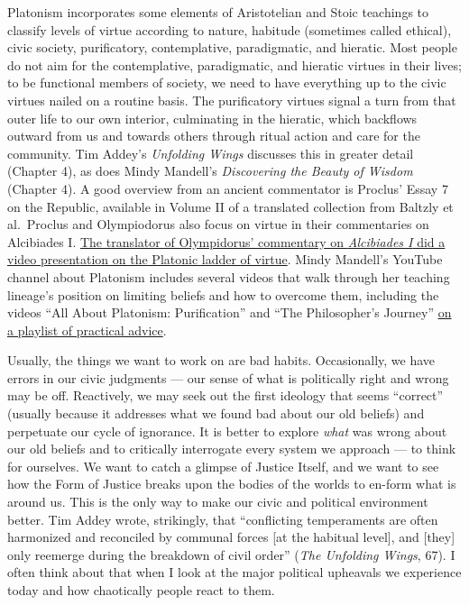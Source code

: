 \documentclass[
]{book}
\begin{document}
Platonism incorporates some elements of Aristotelian and Stoic teachings to classify levels of virtue according to nature, habitude (sometimes called ethical), civic society, purificatory, contemplative, paradigmatic, and hieratic. Most people do not aim for the contemplative, paradigmatic, and hieratic virtues in their lives; to be functional members of society, we need to have everything up to the civic virtues nailed on a routine basis. The purificatory virtues signal a turn from that outer life to our own interior, culminating in the hieratic, which backflows outward from us and towards others through ritual action and care for the community. Tim Addey's \emph{Unfolding Wings} discusses this in greater detail (Chapter 4), as does Mindy Mandell's \emph{Discovering the Beauty of Wisdom} (Chapter 4). A good overview from an ancient commentator is Proclus' Essay 7 on the Republic, available in Volume II of a translated collection from Baltzly et al.~Proclus and Olympiodorus also focus on virtue in their commentaries on Alcibiades I. \href{https://www.academia.edu/44622434/The_Neoplatonic_Scale_of_Virtues_in_Olympiodorus_Body_and_Soul}{The translator of Olympidorus' commentary on \emph{Alcibiades I} did a video presentation on the Platonic ladder of virtue}. Mindy Mandell's YouTube channel about Platonism includes several videos that walk through her teaching lineage's position on limiting beliefs and how to overcome them, including the videos ``All About Platonism: Purification'' and ``The Philosopher's Journey'' \href{https://www.youtube.com/playlist?list=PLoPggAqEExYbxQktPv8XGWm2bnPXUnuZw}{on a playlist of practical advice}.

Usually, the things we want to work on are bad habits. Occasionally, we have errors in our civic judgments --- our sense of what is politically right and wrong may be off. Reactively, we may seek out the first ideology that seems ``correct'' (usually because it addresses what we found bad about our old beliefs) and perpetuate our cycle of ignorance. It is better to explore \emph{what} was wrong about our old beliefs and to critically interrogate every system we approach --- to think for ourselves. We want to catch a glimpse of Justice Itself, and we want to see how the Form of Justice breaks upon the bodies of the worlds to en-form what is around us. This is the only way to make our civic and political environment better. Tim Addey wrote, strikingly, that ``conflicting temperaments are often harmonized and reconciled by communal forces {[}at the habitual level{]}, and {[}they{]} only reemerge during the breakdown of civil order'' (\emph{The Unfolding Wings}, 67). I often think about that when I look at the major political upheavals we experience today and how chaotically people react to them.
\end{document}
